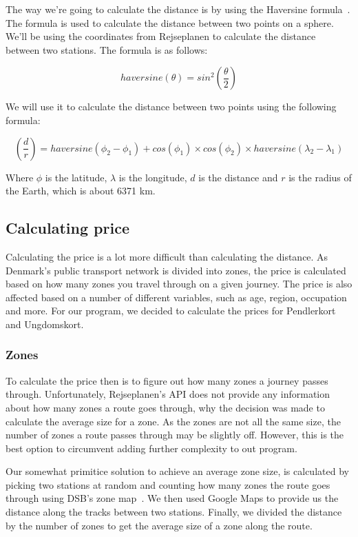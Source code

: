 The way we're going to calculate the distance is by using the Haversine formula~\cite{haversine}.
The formula is used to calculate the distance between two points on a sphere.
We'll be using the coordinates from Rejseplanen to calculate the distance between two stations.
The formula is as follows:

\begin{equation}
    haversine(\theta) = sin^{2}(\frac{\theta}{2})
\end{equation}

We will use it to calculate the distance between two points using the following formula:

\begin{equation}
    (\frac{d}{r}) = haversine(\phi_{2} - \phi_{1}) + cos(\phi_{1}) \times cos(\phi_{2}) \times haversine(\lambda_{2} - \lambda_{1})
\end{equation}

Where \(\phi\) is the latitude, \(\lambda\) is the longitude, \(d\) is the distance and \(r\) is the radius of the
Earth, which is about 6371 km.

\subsection{Calculating price}\label{subsec:calculating-price}

Calculating the price is a lot more difficult than calculating the distance.
As Denmark's public transport network is divided into zones, the price is calculated based on how many zones you travel
through on a given journey.
The price is also affected based on a number of different variables, such as age, region, occupation and more.
For our program, we decided to calculate the prices for Pendlerkort and Ungdomskort.

\subsubsection{Zones}

To calculate the price then is to figure out how many zones a journey passes through.
Unfortunately, Rejseplanen's API does not provide any information about how many zones a route goes through, why the
decision was made to calculate the average size for a zone.
As the zones are not all the same size, the number of zones a route passes through may be slightly off.
However, this is the best option to circumvent adding further complexity to out program.

Our somewhat primitice solution to achieve an average zone size, is calculated by picking two stations at random and
counting how many zones the route goes through using DSB's zone map~\cite{price_zones}.
We then used Google Maps to provide us the distance along the tracks between two stations.
Finally, we divided the distance by the number of zones to get the average size of a zone along the route.

